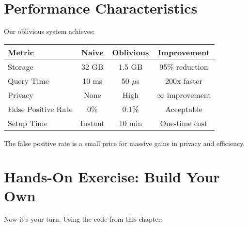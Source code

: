 \section{Performance Characteristics}

Our oblivious system achieves:

\begin{center}
\begin{tabular}{|l|c|c|c|}
\hline
\textbf{Metric} & \textbf{Naive} & \textbf{Oblivious} & \textbf{Improvement} \\
\hline
Storage & 32 GB & 1.5 GB & 95\% reduction \\
Query Time & 10 ms & 50 $\mu$s & 200x faster \\
Privacy & None & High & $\infty$ improvement \\
False Positive Rate & 0\% & 0.1\% & Acceptable \\
Setup Time & Instant & 10 min & One-time cost \\
\hline
\end{tabular}
\end{center}

The false positive rate is a small price for massive gains in privacy and efficiency.

\section{Hands-On Exercise: Build Your Own}

Now it's your turn. Using the code from this chapter:

